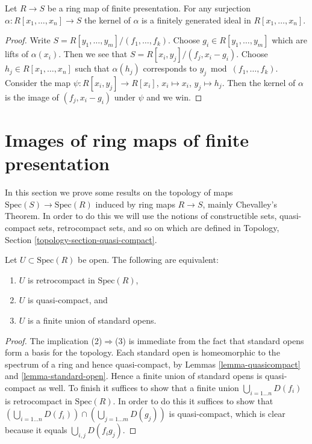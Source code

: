\begin{lemma}
\label{lemma-finite-presentation-independent}
Let $R \to S$ be a ring map of finite presentation.
For any surjection $\alpha : R[x_1, \ldots, x_n] \to S$ the
kernel of $\alpha$ is a finitely generated ideal in $R[x_1, \ldots, x_n]$.
\end{lemma}

\begin{proof}
Write $S = R[y_1, \ldots, y_m]/(f_1, \ldots, f_k)$.
Choose $g_i \in R[y_1, \ldots, y_m]$ which are lifts
of $\alpha(x_i)$. Then we see that $S = R[x_i, y_j]/(f_j, x_i - g_i)$.
Choose $h_j \in R[x_1, \ldots, x_n]$ such that $\alpha(h_j)$
corresponds to $y_j \bmod (f_1, \ldots, f_k)$. Consider
the map $\psi : R[x_i, y_j] \to R[x_i]$, $x_i \mapsto x_i$,
$y_j \mapsto h_j$. Then the kernel of $\alpha$
is the image of $(f_j, x_i - g_i)$ under $\psi$ and we win.
\end{proof}








\section{Images of ring maps of finite presentation}
\label{section-images-finite-presentation}

\noindent
In this section we prove some results on the
topology of maps $\text{Spec}(S) \to \text{Spec}(R)$
induced by ring maps $R \to S$, mainly Chevalley's Theorem.
In order to do this we will use the notions of constructible sets,
quasi-compact sets, retrocompact sets, and so on
which are defined in Topology, Section \ref{topology-section-quasi-compact}.

\begin{lemma}
\label{lemma-qc-open}
Let $U \subset \text{Spec}(R)$ be open. The following
are equivalent:
\begin{enumerate}
\item $U$ is retrocompact in $\text{Spec}(R)$,
\item $U$ is quasi-compact, and
\item $U$ is a finite union of standard opens.
\end{enumerate}
\end{lemma}

\begin{proof}
The implication (2)$\Rightarrow$(3) is immediate from the fact that standard
opens form a basis for the topology. Each standard open is
homeomorphic to the spectrum of a ring and hence quasi-compact,
by Lemmas \ref{lemma-quasicompact} and \ref{lemma-standard-open}.
Hence a finite union of standard opens is quasi-compact as well.
To finish it suffices to show that a finite union
$\bigcup_{i = 1\ldots n} D(f_i)$ is retrocompact in $\text{Spec}(R)$.
In order to do this it suffices to show that
$(\bigcup_{i = 1\ldots n} D(f_i)) \cap (\bigcup_{j = 1\ldots m} D(g_j))$
is quasi-compact, which is clear because it equals
$\bigcup_{i, j} D(f_i g_j)$.
\end{proof}

